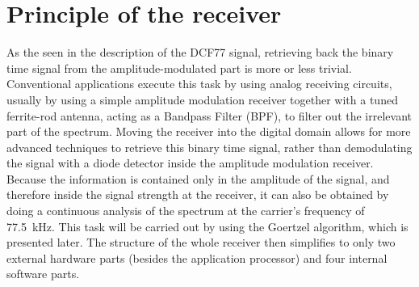 \documentclass[conference]{IEEEtran}
\begin{document}
\section{Principle of the receiver}
As the seen in the description of the DCF77 signal, retrieving back the binary time signal from the amplitude-modulated part is more or less trivial.
Conventional applications execute this task by using analog receiving circuits, usually by using a simple amplitude modulation receiver together with a
tuned ferrite-rod antenna, acting as a Bandpass Filter (BPF), to filter out the irrelevant part of the spectrum. 
Moving the receiver into the digital domain allows for more advanced techniques to retrieve this binary time signal, rather than demodulating the signal with a
diode detector inside the amplitude modulation receiver.
Because the information is contained only in the amplitude of the signal, and therefore inside the signal strength at the receiver, it can also be obtained by doing a
continuous analysis of the spectrum at the carrier's frequency of \SI{77.5}{\kilo\hertz}.
This task will be carried out by using the Goertzel algorithm, which is presented later.
The structure of the whole receiver then simplifies to only two external hardware parts
(besides the application processor) and four internal software parts.
\end{document}

